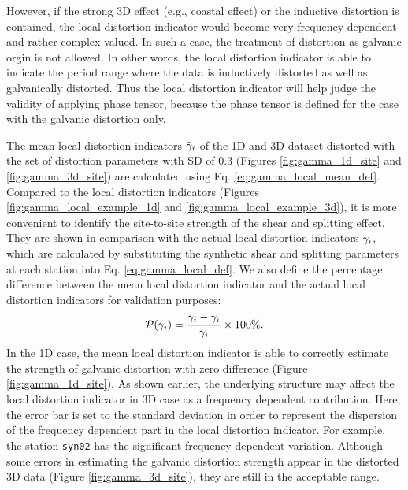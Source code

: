 However, if the strong 3D effect (e.g., coastal effect) or the inductive distortion is contained, the local distortion indicator would become very frequency dependent and rather complex valued. In such a case, the treatment of distortion as galvanic orgin is not allowed. In other words, the local distortion indicator is able to indicate the period range where the data is inductively distorted as well as galvanically distorted. Thus the local distortion indicator will help judge the validity of applying phase tensor, because the phase tensor is defined for the case with the galvanic distortion only.





The mean local distortion indicators $\bar{\gamma}_i$ of the 1D and 3D dataset distorted with the set of distortion parameters with SD of 0.3 (Figures \ref{fig:gamma_1d_site} and \ref{fig:gamma_3d_site}) are calculated using Eq. \eqref{eq:gamma_local_mean_def}.
%
Compared to the local distortion indicators (Figures \ref{fig:gamma_local_example_1d} and \ref{fig:gamma_local_example_3d}), it is more convenient to identify the site-to-site strength of the shear and splitting effect.
%
They are shown in comparison with the actual local distortion indicators $\gamma_i$, which are calculated by substituting the synthetic shear and splitting parameters at each station into Eq. \eqref{eq:gamma_local_def}.
%
We also define the percentage difference between the mean local distortion indicator and the actual local distortion indicators for validation purposes:
	\begin{equation}
		\mathcal{P}(\bar{\gamma}_i) = \frac{\bar{\gamma}_i - \gamma_i}{\gamma_i} \times 100\%.
	\end{equation}	
In the 1D case, the mean local distortion indicator is able to correctly estimate the strength of galvanic distortion with zero difference (Figure \ref{fig:gamma_1d_site}).
%
As shown earlier, the underlying structure may affect the local distortion indicator in 3D case as a frequency dependent contribution.
%
Here, the error bar is set to the standard deviation in order to represent the dispersion of the frequency dependent part in the local distortion indicator. For example, the station \texttt{syn02} has the significant frequency-dependent variation.
Although some errors in estimating the galvanic distortion strength appear in the distorted 3D data (Figure \ref{fig:gamma_3d_site}), they are still in the acceptable range.

